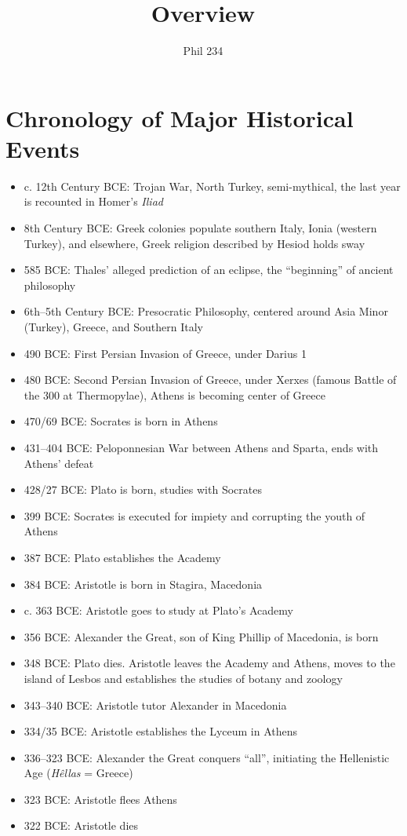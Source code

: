 \documentclass[10 pt]{article}
\begin{document}
\author{Phil 234}
\title{Overview}
\maketitle
\section*{Chronology of Major Historical Events}
\begin{itemize}
\item{c. 12th Century BCE: Trojan War, North Turkey,  semi-mythical, the last year is recounted in Homer's \emph{Iliad}}
\item{8th Century BCE: Greek colonies populate southern Italy, Ionia (western Turkey), and elsewhere, Greek religion described by Hesiod holds sway}
\item 585 BCE: Thales' alleged prediction of an eclipse, the ``beginning'' of ancient philosophy
\item{6th--5th Century BCE: Presocratic Philosophy, centered around Asia Minor (Turkey), Greece, and Southern Italy}
\item{490 BCE: First Persian Invasion of Greece, under Darius 1}
\item{480 BCE: Second Persian Invasion of Greece, under Xerxes (famous Battle of the 300 at Thermopylae), Athens is becoming center of Greece}
\item{470/69 BCE: Socrates is born in Athens}
\item{431--404 BCE: Peloponnesian War between Athens and Sparta, ends with Athens' defeat}
\item{428/27 BCE: Plato is born, studies with Socrates}
\item{399 BCE: Socrates is executed for impiety and corrupting the youth of Athens}
\item{387 BCE: Plato establishes the Academy}

\item{384 BCE: Aristotle is born in Stagira, Macedonia}
\item{c. 363 BCE: Aristotle goes to study at Plato's Academy}
\item{356 BCE: Alexander the Great, son of King Phillip of Macedonia, is born}
\item{348 BCE: Plato dies. Aristotle leaves the Academy and Athens, moves to the island of Lesbos and establishes the studies of botany and zoology}
\item{343--340 BCE: Aristotle tutor Alexander in Macedonia}
\item{334/35 BCE: Aristotle establishes the Lyceum in Athens}
\item{336--323 BCE: Alexander the Great conquers ``all'', initiating the Hellenistic Age (\emph{H\^{e}llas} = Greece)}
\item{323 BCE: Aristotle flees Athens }
\item{322 BCE: Aristotle dies}


\end{itemize}
\end{document}
